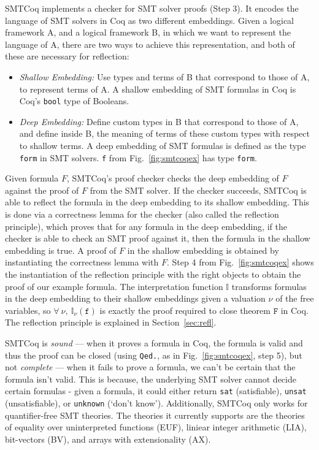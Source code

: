 \documentclass{article}
\begin{document}
	SMTCoq implements a checker for 
	SMT solver proofs (Step 3). It 
	encodes the language of SMT solvers
	in Coq as two different embeddings. 
	Given a logical framework A, and 
	a logical framework B, in which we 
	want to represent the language of A, 
	there are two ways to achieve this
	representation, and 
	both of these are necessary for 
	reflection:
	\begin{itemize}
		\item \textit{Shallow Embedding: }
		Use types and terms of B that 
		correspond to those of A, to 
		represent terms of A. A shallow
		embedding of SMT formulas in 
		Coq is Coq's \texttt{bool} 
		type of Booleans.
		\item\textit{Deep Embedding: }
		Define custom types in B that 
		correspond to those of A, and 
		define inside B, the meaning of 
		terms of these custom types with 
		respect to shallow terms. A 
		deep embedding of SMT formulas 
		is defined as the type 
		\texttt{form} in SMT solvers.
		\texttt{f} from 
		Fig.~\ref{fig:smtcoqex} has
		type \texttt{form}.
	\end{itemize}
	
	Given formula $F$, SMTCoq's proof 
	checker checks the deep embedding of 
	$F$ against the proof of $F$ from the 
	SMT solver. If the checker succeeds, 
	SMTCoq is able to reflect the formula in 
	the deep embedding to its shallow 
	embedding. This is done via a 
	correctness lemma for the checker
	(also called the reflection principle),
	which proves that for any 
	formula in the deep embedding, if 
	the checker is able to check an SMT
	proof against it, then the formula in 
	the shallow embedding is true. A 
	proof of $F$ in the shallow 
	embedding is obtained by instantiating 
	the correctness lemma with $F$.
	Step 4 from Fig.~\ref{fig:smtcoqex} 
	shows the instantiation of 
	the reflection principle with 
	the right objects to obtain the 
	proof of our example formula. 
	The interpretation function
	$\mathbb{I}$ transforms 
	formulas in the deep embedding
	to their shallow embeddings
	given a valuation $\nu$ of the 
	free variables, so 
	$\forall\ \nu,\ 
	\mathbb{I}_{\nu}(\texttt{f})$
	is exactly the proof required 
	to close theorem $\texttt{F}$
	in Coq. The reflection principle 
	is explained in Section~\ref{sec:refl}.	
	
	SMTCoq is \textit{sound} ---
	when it proves a formula in Coq, the 
	formula is valid and thus the proof
	can be closed (using \texttt{Qed.},
	as in Fig.~\ref{fig:smtcoqex}, 
	step 5), but 
	not \textit{complete} --- when it 
	fails to prove a formula, we can't 
	be certain that the formula isn't 
	valid. This is because, the underlying 
	SMT solver cannot decide certain 
	formulas - given a formula, it could 
	either return \texttt{sat} 
	(satisfiable), \texttt{unsat} 
	(unsatisfiable), or 
	\texttt{unknown} (`don't know').
	Additionally, SMTCoq only works for 
	quantifier-free SMT theories. The 
	theories it currently supports 
	are the theories of equality over
	uninterpreted functions (EUF), 
	liniear integer arithmetic (LIA),
	bit-vectors (BV), and arrays with
	extensionality (AX).
	
\end{document}
